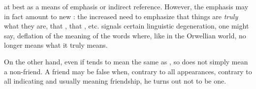 at best as a means of emphasis or indirect reference. However, the emphasis may
in fact amount to new : the increased need to emphasize that
things are {\em truly} what they are, that , that
, etc.  signals certain linguistic degeneration,
one might say, deflation of the meaning of the words where, like in the
Orwellian world,  no longer means what it truly means.
 
On the other hand, even if  tends to mean the same as
, so  does not simply mean a non-friend.  A friend
may be false when, contrary to all appearances, contrary to all 
indicating and usually meaning friendship, he turns out not to be one.

